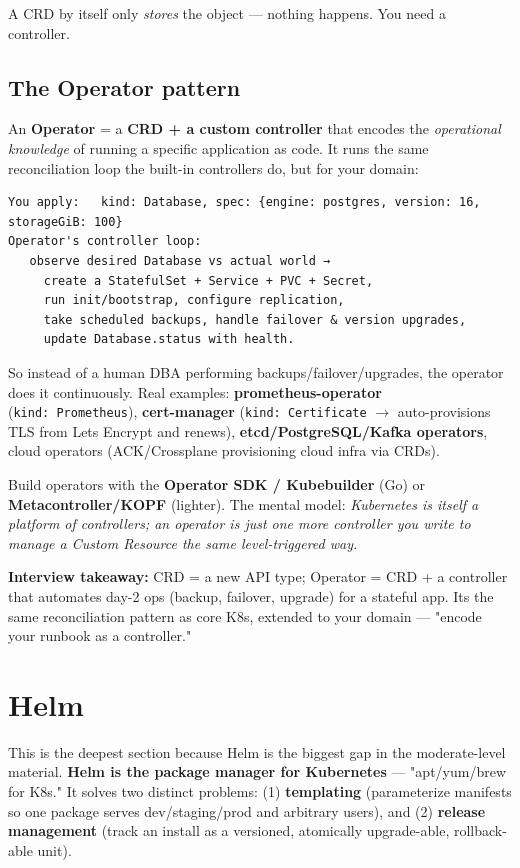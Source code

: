 \documentclass[11pt]{article}
\begin{document}
A CRD by itself only \emph{stores} the object --- nothing happens. You need a controller.

\subsection{The Operator pattern}\label{the-operator-pattern}

An \textbf{Operator} = a \textbf{CRD + a custom controller} that encodes the \emph{operational knowledge} of running a specific application as code. It runs the same reconciliation loop the built-in controllers do, but for your domain:

\setcodelang{}

\begin{verbatim}
You apply:   kind: Database, spec: {engine: postgres, version: 16, storageGiB: 100}
Operator's controller loop:
   observe desired Database vs actual world →
     create a StatefulSet + Service + PVC + Secret,
     run init/bootstrap, configure replication,
     take scheduled backups, handle failover & version upgrades,
     update Database.status with health.
\end{verbatim}

So instead of a human DBA performing backups/failover/upgrades, the operator does it continuously. Real examples: \textbf{prometheus-operator} (\texttt{kind:\ Prometheus}), \textbf{cert-manager} (\texttt{kind:\ Certificate} \(\rightarrow\) auto-provisions TLS from Let\textquotesingle s Encrypt and renews), \textbf{etcd/PostgreSQL/Kafka operators}, cloud operators (ACK/Crossplane provisioning cloud infra via CRDs).

Build operators with the \textbf{Operator SDK / Kubebuilder} (Go) or \textbf{Metacontroller/KOPF} (lighter). The mental model: \emph{Kubernetes is itself a platform of controllers; an operator is just one more controller you write to manage a Custom Resource the same level-triggered way.}

\textbf{Interview takeaway:} CRD = a new API type; Operator = CRD + a controller that automates day-2 ops (backup, failover, upgrade) for a stateful app. It\textquotesingle s the same reconciliation pattern as core K8s, extended to your domain --- "encode your runbook as a controller."

\section{Helm}\label{helm}

This is the deepest section because Helm is the biggest gap in the moderate-level material. \textbf{Helm is the package manager for Kubernetes} --- "apt/yum/brew for K8s." It solves two distinct problems: (1) \textbf{templating} (parameterize manifests so one package serves dev/staging/prod and arbitrary users), and (2) \textbf{release management} (track an install as a versioned, atomically upgrade-able, rollback-able unit).
\end{document}
